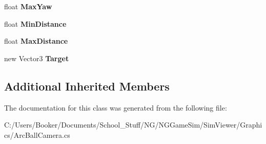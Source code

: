 \begin{DoxyCompactItemize}
float {\bfseries Max\+Yaw}
\item 
\mbox{\label{class_n_g_sim_1_1_graphics_1_1_arc_ball_camera_aa03edac8cd6f5564dc684071a81e0863}} 
float {\bfseries Min\+Distance}
\item 
\mbox{\label{class_n_g_sim_1_1_graphics_1_1_arc_ball_camera_af6afb1597fc7b1526dda10baa5fd1d29}} 
float {\bfseries Max\+Distance}
\item 
\mbox{\label{class_n_g_sim_1_1_graphics_1_1_arc_ball_camera_a6a7626117810e2bf6dc60e654bfdc1c3}} 
new Vector3 {\bfseries Target}
\end{DoxyCompactItemize}
\subsection*{Additional Inherited Members}


The documentation for this class was generated from the following file\+:\begin{DoxyCompactItemize}
\item 
C\+:/\+Users/\+Booker/\+Documents/\+School\+\_\+\+Stuff/\+N\+G/\+N\+G\+Game\+Sim/\+Sim\+Viewer/\+Graphics/Arc\+Ball\+Camera.\+cs\end{DoxyCompactItemize}
